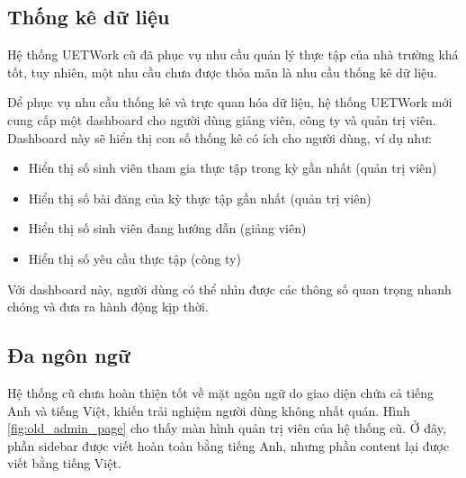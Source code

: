 \documentclass[./../main.tex]{subfiles}
\begin{document}
\hypertarget{thux1ed1ng-kuxea-dux1eef-liux1ec7u}{%
\subsection{Thống kê dữ
liệu}\label{thux1ed1ng-kuxea-dux1eef-liux1ec7u}}

Hệ thống UETWork cũ đã phục vụ nhu cầu quản lý thực tập của nhà trường khá tốt, tuy nhiên, một nhu cầu chưa được thỏa mãn là nhu cầu thống kê dữ liệu.

Để phục vụ nhu cầu thống kê và trực quan hóa dữ liệu, hệ thống UETWork mới cung cấp một dashboard cho người dùng giảng viên, công ty và quản trị viên. Dashboard này sẽ hiển thị con số thống kê có ích cho người dùng, ví dụ như:

\begin{itemize}
\item
  
  Hiển thị số sinh viên tham gia thực tập trong kỳ gần nhất (quản trị
  viên)
  
\item
  
  Hiển thị số bài đăng của kỳ thực tập gần nhất (quản trị viên)
  
\item
  
  Hiển thị số sinh viên đang hướng dẫn (giảng viên)
  
\item
  
  Hiển thị số yêu cầu thực tập (công ty)
  
\end{itemize}

Với dashboard này, người dùng có thể nhìn được các thông số quan trọng nhanh chóng và đưa ra hành động kịp thời.

\hypertarget{ux111a-nguxf4n-ngux1eef-1}{%
\subsection{Đa ngôn ngữ}\label{ux111a-nguxf4n-ngux1eef-1}}

Hệ thống cũ chưa hoàn thiện tốt về mặt ngôn ngữ do giao diện chứa cả tiếng Anh và tiếng Việt, khiến trải nghiệm người dùng không nhất quán. Hình \ref{fig:old_admin_page} cho thấy màn hình quản trị viên của hệ thống cũ. Ở đây, phần sidebar được viết hoàn toàn bằng tiếng Anh, nhưng phần content lại được viết bằng tiếng Việt.
\end{document}
